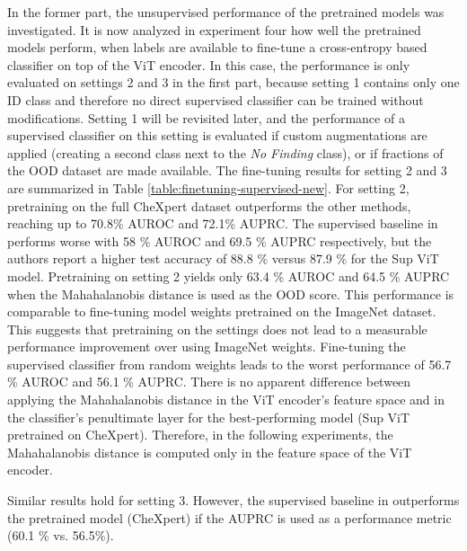 \par
In the former part, the unsupervised performance of the pretrained models was investigated.
It is now analyzed in experiment four how well the pretrained models perform, when labels are available to fine-tune a cross-entropy based classifier on top of the ViT encoder.
In this case, the performance is only evaluated on settings 2 and 3 in the first part, because setting 1 contains only one ID class and therefore no direct supervised classifier can be trained without modifications.
Setting 1 will be revisited later, and the performance of a supervised classifier on this setting is evaluated if custom augmentations are applied (creating a second class next to the \textit{No Finding} class), or if fractions of the OOD dataset are made available.
The fine-tuning results for setting 2 and 3 are summarized in Table \ref{table:finetuning-supervised-new}.
For setting 2, pretraining on the full CheXpert dataset outperforms the other methods, reaching up to 70.8\% AUROC and 72.1\% AUPRC.
The supervised baseline in \citep{Berger2021} performs worse with 58 \% AUROC and 69.5 \% AUPRC respectively, but the authors report a higher test accuracy of 88.8 \% versus 87.9 \% for the Sup ViT model.
Pretraining on setting 2 yields only 63.4 \% AUROC and 64.5 \% AUPRC when the Mahahalanobis distance is used as the OOD score.
This performance is comparable to fine-tuning model weights pretrained on the ImageNet dataset.
This suggests that pretraining on the settings does not lead to a measurable performance improvement over using ImageNet weights.
Fine-tuning the supervised classifier from random weights leads to the worst performance of 56.7 \% AUROC and 56.1 \% AUPRC.
There is no apparent difference between applying the Mahahalanobis distance in the ViT encoder's feature space and in the classifier's penultimate layer for the best-performing model (Sup ViT pretrained on CheXpert).
Therefore, in the following experiments, the Mahahalanobis distance is computed only in the feature space of the ViT encoder.
\par
Similar results hold for setting 3. 
However, the supervised baseline in \citep{Berger2021} outperforms the pretrained model (CheXpert) if the AUPRC is used as a performance metric (60.1 \% vs. 56.5\%).
